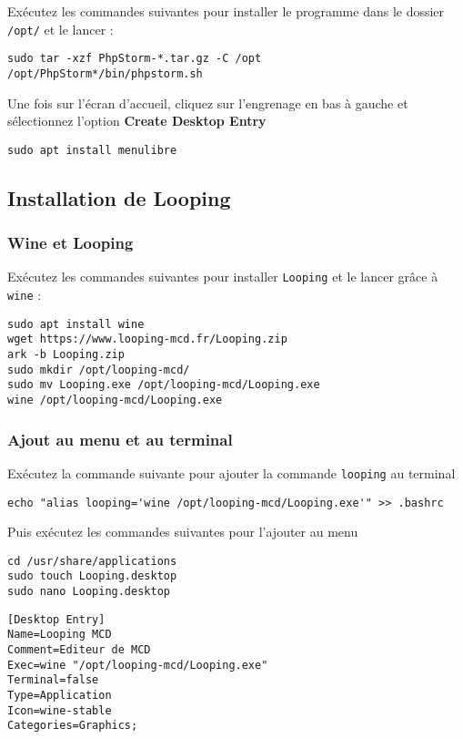 Exécutez les commandes suivantes pour installer le programme dans  le dossier \texttt{/opt/} et le lancer :

\begin{lstlisting}
sudo tar -xzf PhpStorm-*.tar.gz -C /opt
/opt/PhpStorm*/bin/phpstorm.sh
\end{lstlisting}

Une fois sur l'écran d'accueil, cliquez sur l'engrenage en bas à gauche et sélectionnez l'option \textbf{Create Desktop Entry}

\begin{lstlisting}
sudo apt install menulibre
\end{lstlisting}

\subsection{Installation de Looping}

\subsubsection{Wine et Looping}

Exécutez les commandes suivantes pour installer \texttt{Looping} et le lancer grâce à \texttt{wine} :

\begin{lstlisting}
sudo apt install wine
wget https://www.looping-mcd.fr/Looping.zip
ark -b Looping.zip
sudo mkdir /opt/looping-mcd/
sudo mv Looping.exe /opt/looping-mcd/Looping.exe
wine /opt/looping-mcd/Looping.exe
\end{lstlisting}

\subsubsection{Ajout au menu et au terminal}

Exécutez la commande suivante pour ajouter la commande \texttt{looping} au terminal
\begin{lstlisting}
echo "alias looping='wine /opt/looping-mcd/Looping.exe'" >> .bashrc
\end{lstlisting}

Puis exécutez les commandes suivantes pour l'ajouter au menu

\begin{lstlisting}
cd /usr/share/applications
sudo touch Looping.desktop
sudo nano Looping.desktop	
\end{lstlisting}

\begin{lstlisting}[style=tf]
[Desktop Entry]
Name=Looping MCD
Comment=Editeur de MCD
Exec=wine "/opt/looping-mcd/Looping.exe"
Terminal=false
Type=Application
Icon=wine-stable
Categories=Graphics;
\end{lstlisting}


